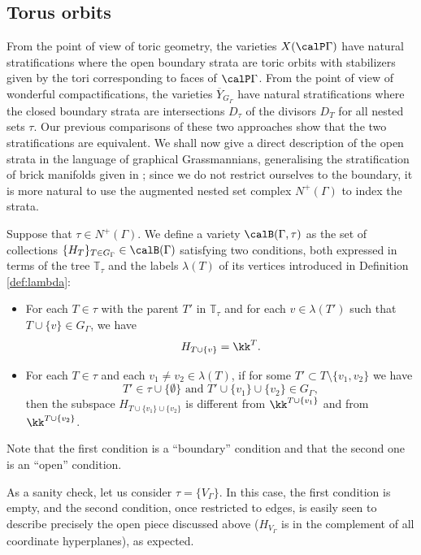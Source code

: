 \subsection{Torus orbits} \label{sec:toric-orbits}
From the point of view of toric geometry, the varieties $X(\calP\Gamma)$ have natural stratifications where the open boundary strata are toric orbits with stabilizers given by the tori corresponding to faces of $\calP\Gamma$. From the point of view of wonderful compactifications, the varieties $\overline{Y}_{G_\Gamma}$ have natural stratifications where the closed boundary strata are intersections $D_\tau$ of the divisors $D_T$ for all nested sets $\tau$. Our previous comparisons of these two approaches show that the two stratifications are equivalent. We shall now give a direct description of the open strata in the language of graphical Grassmannians, generalising the stratification of brick manifolds given in \cite[Def.5.1.4]{MR4072173}; since we do not restrict ourselves to the boundary, it is more natural to use the augmented nested set complex $N^+(\Gamma)$ to index the strata. 

Suppose that $\tau\in N^+(\Gamma)$. We define a variety $\calB(\Gamma,\tau)$ as the set of collections $\{H_T\}_{T\in G_\Gamma}\in \calB(\Gamma)$ satisfying two conditions, both expressed in terms of the tree $\mathbb{T}_\tau$ and the labels $\lambda(T)$ of its vertices introduced in Definition \ref{def:lambda}:  
\begin{itemize}
\item For each $T\in\tau$ with the parent $T'$ in $\mathbb{T}_\tau$ and for each $v\in \lambda(T')$ such that $T\cup\{v\}\in G_\Gamma$, we have 
 \[
H_{T\cup\{v\}}=\kk^{T}.
 \] 
\item For each $T\in\tau$ and each $v_1\ne v_2\in \lambda(T)$, 
if for some $T'\subset T\setminus\{v_1,v_2\}$ we have 
 \[
T'\in \tau\cup\{\emptyset\}\text{  and } T'\cup\{v_1\}\cup\{v_2\}\in G_\Gamma,
 \] 
then the subspace $H_{T\cup\{v_1\}\cup\{v_2\}}$ is different from $\kk^{T\cup\{v_1\}}$ and from $\kk^{T\cup\{v_2\}}$.
\end{itemize}
Note that the first condition is a ``boundary'' condition and that the second one is an ``open'' condition.

As a sanity check, let us consider $\tau=\{V_\Gamma\}$. In this case, the first condition is empty, and the second condition, once restricted to edges, is easily seen to describe precisely the open piece discussed above ($H_{V_\Gamma}$ is in the complement of all coordinate hyperplanes), as expected.

